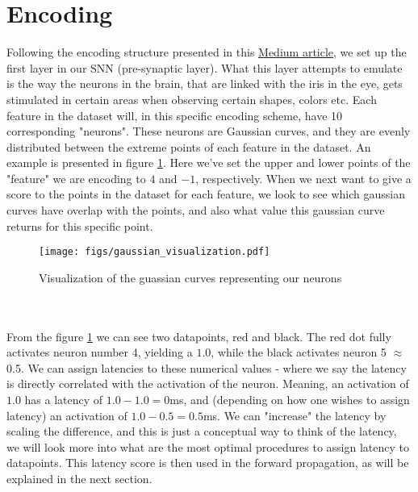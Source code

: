 \documentclass{article}
\begin{document}
\section*{Encoding}
Following the encoding structure presented in this \href{https://medium.com/@tapwi93/first-steps-in-spiking-neural-networks-da3c82f538ad}{Medium article}, we set up the first layer in our SNN (pre-synaptic layer). What this layer attempts to emulate is the way the neurons in the brain, that are linked with the iris in the eye, gets stimulated in certain areas when observing certain shapes, colors etc. Each feature in the dataset will, in this specific encoding scheme, have 10 corresponding "neurons". These neurons are Gaussian curves, and they are evenly distributed between the extreme points of each feature in the dataset. An example is presented in figure \ref{fig:gauss_encode}. Here we've set the upper and lower points of the "feature" we are encoding to $4$ and $-1$, respectively. When we next want to give a score to the points in the dataset for each feature, we look to see which gaussian curves have overlap with the points, and also what value this gaussian curve returns for this specific point.  
\begin{figure}[h!]
    \centering
    \texttt{[image: figs/gaussian\_visualization.pdf]}
    \caption{Visualization of the guassian curves representing our neurons}
    \label{fig:gauss_encode}
\end{figure}
\\ \\  From the figure \ref{fig:gauss_encode} we can see two datapoints, red and black. The red dot fully activates neuron number 4, yielding a $1.0$, while the black activates neuron 5 $\approx$ 0.5. We can assign latencies to these numerical values - where we say the latency is directly correlated with the activation of the neuron. Meaning, an activation of $1.0$ has a latency of $1.0 - 1.0 = 0$ms, and (depending on how one wishes to assign latency) an activation of $1.0 - 0.5 = 0.5$ms. We can "increase" the latency by scaling the difference, and this is just a conceptual way to think of the latency, we will look more into what are the most optimal procedures to assign latency to datapoints. This latency score is then used in the forward propagation, as will be explained in the next section.
\newpage
\end{document}

